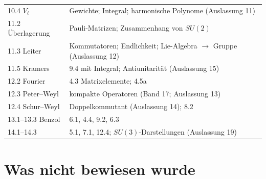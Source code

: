 \begin{merksatz}
\begin{center}
{\begin{tabular}{@{}P{3.4cm}P{5.2cm}@{}}
10.4 $V_\ell$ & Gewichte; Integral; harmonische Polynome (Auslassung 11)\\
11.2 Überlagerung & Pauli-Matrizen; Zusammenhang von $SU(2)$\\
11.3 Leiter & Kommutatoren; Endlichkeit; Lie-Algebra $\to$ Gruppe (Auslassung 12)\\
11.5 Kramers & 9.4 mit Integral; Antiunitarität (Auslassung 15)\\
12.2 Fourier & 4.3 Matrixelemente; 4.5a\\
12.3 Peter--Weyl & kompakte Operatoren (Band 17; Auslassung 13)\\
12.4 Schur--Weyl & Doppelkommutant (Auslassung 14); 8.2\\
13.1--13.3 Benzol & 6.1, 4.4, 9.2, 6.3\\
14.1--14.3 & 5.1, 7.1, 12.4; $SU(3)$-Darstellungen (Auslassung 19)\\
\bottomrule
\end{tabular}}
\end{center}
\end{merksatz}

\section{Was nicht bewiesen wurde}

